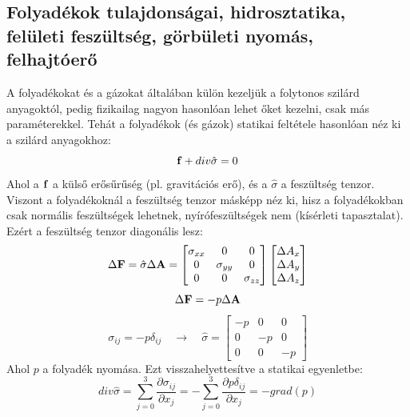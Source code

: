 \documentclass[../main.tex]{subfiles}
\begin{document}
\subsection{Folyadékok tulajdonságai, hidrosztatika, felületi feszültség, görbületi nyomás, felhajtóerő}
A folyadékokat és a gázokat általában külön kezeljük a folytonos szilárd anyagoktól, pedig fizikailag nagyon hasonlóan lehet őket kezelni, csak 
más paraméterekkel. Tehát a folyadékok (és gázok) statikai feltétele hasonlóan néz ki a szilárd anyagokhoz:
\begin{equation}
    \bold{f} + div \hat{\sigma} = 0
\end{equation}
Ahol a $\bold{f}$ a külső erősűrűség (pl. gravitációs erő), és a $\hat{\sigma}$ a feszültség tenzor. Viszont a folyadékoknál a feszültség tenzor
másképp néz ki, hisz a folyadékokban csak normális feszültségek lehetnek, nyírófeszültségek nem (kísérleti tapasztalat). Ezért a feszültség tenzor diagonális lesz:
\begin{equation}
    \Delta \bold{F} = \hat{\sigma} \Delta \bold{A} = \begin{bmatrix}
        \sigma_{xx} & 0 & 0 \\
        0 & \sigma_{yy} & 0 \\
        0 & 0 & \sigma_{zz}
    \end{bmatrix} \begin{bmatrix}
        \Delta A_x \\
        \Delta A_y \\
        \Delta A_z
    \end{bmatrix}
\end{equation}
\begin{equation}
    \Delta \bold{F} = - p \Delta \bold{A}
\end{equation}
\begin{equation}
    \sigma_{ij} = -p \delta_{ij} \quad \rightarrow \quad \hat{\sigma} = \begin{bmatrix}
        -p & 0 & 0 \\
        0 & -p & 0 \\
        0 & 0 & -p
    \end{bmatrix}
\end{equation}
Ahol $p$ a folyadék nyomása. Ezt visszahelyettesítve a statikai egyenletbe:
\begin{equation}
    div \hat{\sigma} = \sum_{j = 0}^{3}\frac{\partial \sigma_{ij}}{\partial x_j} = - \sum_{j = 0}^{3} \frac{\partial p \delta_{ij}}{\partial x_j} = - grad(p)
\end{equation}
\end{document}
